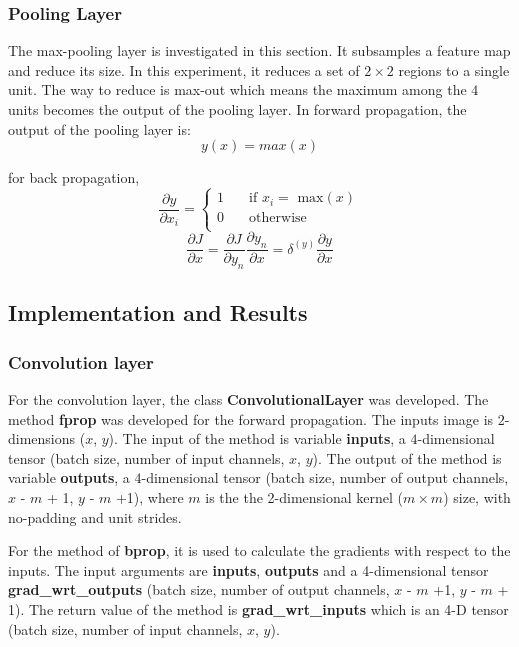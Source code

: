 \documentclass[11pt]{article}
\begin{document}
\subsubsection{Pooling Layer}
The max-pooling layer is investigated in this section. It subsamples a feature map and reduce its size. In this experiment, it reduces a set of $2\times 2$ regions to a single unit. The way to reduce is max-out which means the maximum among the $4$ units becomes the output of the pooling layer. In forward propagation, the output of the pooling layer is:
\begin{equation}
	y(x) = max(x)
\end{equation}

for back propagation,
\[ \frac{\partial y}{\partial x_i} =
  \begin{cases}
    1       & \quad \text{if } x_i =\text{ max} (x)\\
    0  & \quad \text{otherwise }\\
  \end{cases}
\]
\begin{equation}
	\frac{\partial J}{\partial x} = \frac{\partial J}{\partial y_n}\frac{\partial y_n}{\partial x} = \delta^{(y)}\frac{\partial y}{\partial x}
\end{equation}
\subsection{Implementation and Results}
\subsubsection{Convolution layer}
For the convolution layer, the class {\bf ConvolutionalLayer} was developed. The method {\bf fprop} was developed for the forward propagation. The inputs image is $2$-dimensions ($x$, $y$). The input of the method is variable {\bf inputs}, a $4$-dimensional tensor (batch size, number of input channels, $x$, $y$). The output of the method is variable {\bf outputs}, a $4$-dimensional tensor (batch size, number of output channels, $x$ - $m$ + 1, $y$ - $m$ +1), where $m$ is the the 2-dimensional kernel ($m \times m$) size, with no-padding and unit strides. 

For the method of {\bf bprop}, it is used to calculate the gradients with respect to the inputs. The input arguments are {\bf inputs}, {\bf outputs} and a 4-dimensional tensor {\bf grad\_wrt\_outputs} (batch size, number of output channels, $x$ - $m$ +1, $y$ - $m$ + 1). The return value of the method is {\bf grad\_wrt\_inputs} which is an 4-D tensor (batch size, number of input channels, $x$, $y$). 
\end{document}
